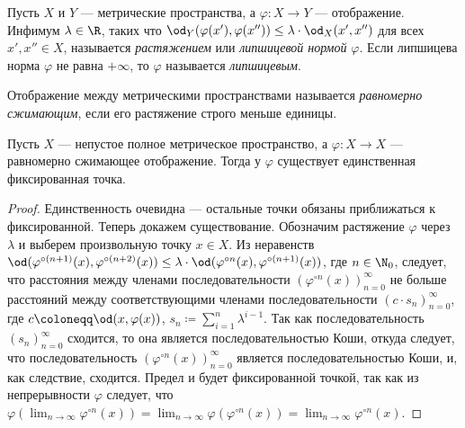 \documentclass[
	extrafontsizes,
	11pt,
	hyphens,
]{memoir}
\begin{document}
\begin{definition}
Пусть \(X\) и \(Y\) --- метрические пространства,
а \(\varphi: X \to Y\) --- отображение.
Инфимум \(\lambda \in \R\), таких что
\(\od_Y(\varphi(x'), \varphi(x'')) \leq \lambda \cdot \od_X(x', x'')\)
для всех \(x',x'' \in X\),
называется \emph{растяжением} или \emph{липшицевой нормой} \(\varphi\).
Если липшицева норма \(\varphi\)
не равна \(+\infty\),
то \(\varphi\) называется \emph{липшицевым}.
\end{definition}

\begin{definition}
Отображение между метрическими пространствами называется \emph{равномерно сжимающим}, если его растяжение строго меньше единицы.
\end{definition}

\begin{theorem}
Пусть \(X\) --- непустое полное метрическое пространство, а
\(\varphi: X \to X\) --- равномерно сжимающее отображение. Тогда у \(\varphi\) существует единственная фиксированная точка.
\end{theorem}

\begin{proof}
Единственность очевидна --- остальные точки обязаны приближаться к фиксированной.
Теперь докажем существование.
Обозначим растяжение \(\varphi\) через \(\lambda\) и выберем произвольную точку \(x \in X\).
Из неравенств
\(
\od(\varphi^{\circ (n+1)}(x), \varphi^{\circ (n+2)}(x))
\leq
\lambda \cdot
\od(\varphi^{\circ n}(x), \varphi^{\circ (n+1)}(x)) 
\),
где \(n \in \N_0\),
следует, что расстояния между членами последовательности \((\varphi^{\circ n}(x))_{n = 0}^\infty\) не больше расстояний между соответствующими членами последовательности
\((c \cdot s_n)_{n=0}^\infty\),
где
\(c \coloneqq \od(x, \varphi(x))\),
\(s_n \coloneqq \sum_{i = 1}^n \lambda^{i-1}\).
Так как последовательность
\((s_n)_{n=0}^\infty\)
сходится, то она является последовательностью Коши, откуда следует, что последовательность \((\varphi^{\circ n}(x))_{n = 0}^\infty\) является последовательностью Коши, и, как следствие, сходится.
Предел и будет фиксированной точкой, так как из непрерывности \(\varphi\) следует, что
\(\varphi(\lim_{n \to \infty} \varphi^{\circ n}(x)) = \lim_{n \to \infty} \varphi(\varphi^{\circ n}(x)) = \lim_{n \to \infty} \varphi^{\circ n}(x)\).
\end{proof}
\end{document}
